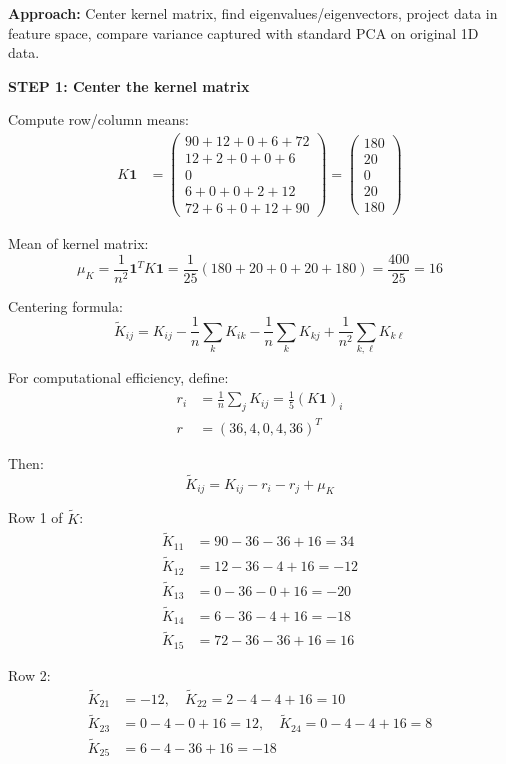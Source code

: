 \documentclass[12pt]{article}
\begin{document}
\begin{solution}

\textbf{Approach:} Center kernel matrix, find eigenvalues/eigenvectors, project data in feature space, compare variance captured with standard PCA on original 1D data.

\textbf{STEP 1: Center the kernel matrix}

Compute row/column means:
\begin{align*}
K\mathbf{1} &= \begin{pmatrix} 90+12+0+6+72 \\ 12+2+0+0+6 \\ 0 \\ 6+0+0+2+12 \\ 72+6+0+12+90 \end{pmatrix} = \begin{pmatrix} 180 \\ 20 \\ 0 \\ 20 \\ 180 \end{pmatrix}
\end{align*}

Mean of kernel matrix:
\[
\mu_K = \frac{1}{n^2} \mathbf{1}^T K \mathbf{1} = \frac{1}{25}(180 + 20 + 0 + 20 + 180) = \frac{400}{25} = 16
\]

Centering formula:
\[
\tilde{K}_{ij} = K_{ij} - \frac{1}{n}\sum_k K_{ik} - \frac{1}{n}\sum_k K_{kj} + \frac{1}{n^2}\sum_{k,\ell} K_{k\ell}
\]

For computational efficiency, define:
\begin{align*}
r_i &= \frac{1}{n}\sum_j K_{ij} = \frac{1}{5}(K\mathbf{1})_i \\
r &= (36, 4, 0, 4, 36)^T
\end{align*}

Then:
\[
\tilde{K}_{ij} = K_{ij} - r_i - r_j + \mu_K
\]

Row 1 of $\tilde{K}$:
\begin{align*}
\tilde{K}_{11} &= 90 - 36 - 36 + 16 = 34 \\
\tilde{K}_{12} &= 12 - 36 - 4 + 16 = -12 \\
\tilde{K}_{13} &= 0 - 36 - 0 + 16 = -20 \\
\tilde{K}_{14} &= 6 - 36 - 4 + 16 = -18 \\
\tilde{K}_{15} &= 72 - 36 - 36 + 16 = 16
\end{align*}

Row 2:
\begin{align*}
\tilde{K}_{21} &= -12, \quad \tilde{K}_{22} = 2 - 4 - 4 + 16 = 10 \\
\tilde{K}_{23} &= 0 - 4 - 0 + 16 = 12, \quad \tilde{K}_{24} = 0 - 4 - 4 + 16 = 8 \\
\tilde{K}_{25} &= 6 - 4 - 36 + 16 = -18
\end{align*}


\end{solution}
\end{document}
